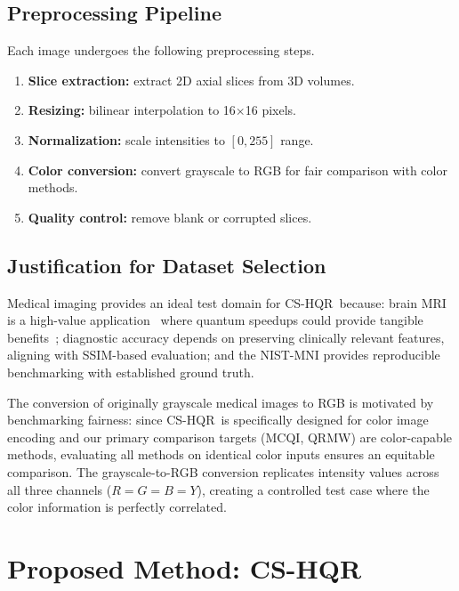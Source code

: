 \documentclass{ipol}
\newcommand{\cshqr}{\textsc{CS-HQR}}
\newcommand{\mcqi}{\textsc{MCQI}}
\begin{document}
\FloatBarrier
\subsection{Preprocessing Pipeline}

Each image undergoes the following preprocessing steps.
\begin{enumerate}
  \item \textbf{Slice extraction:} extract 2D axial slices from 3D volumes.
  \item \textbf{Resizing:} bilinear interpolation to 16$\times$16 pixels.
  \item \textbf{Normalization:} scale intensities to $[0, 255]$ range.
  \item \textbf{Color conversion:} convert grayscale to RGB for fair
    comparison with color methods.
  \item \textbf{Quality control:} remove blank or corrupted slices.
\end{enumerate}

\FloatBarrier
\subsection{Justification for Dataset Selection}

Medical imaging provides an ideal test domain for \cshqr\ because:
brain MRI is a high-value application~\cite{ref29,ref59,ref68} where quantum speedups could provide
tangible benefits~\cite{ref62,ref65}; diagnostic accuracy depends on preserving clinically
relevant features, aligning with SSIM-based evaluation; and the NIST-MNI
provides reproducible benchmarking with established ground truth.

The conversion of originally grayscale medical images to RGB is motivated by
benchmarking fairness: since \cshqr\ is specifically designed for color image
encoding and our primary comparison targets (\mcqi, QRMW) are color-capable
methods, evaluating all methods on identical color inputs ensures an equitable
comparison. The grayscale-to-RGB conversion replicates intensity values across
all three channels ($R = G = B = Y$), creating a controlled test case where
the color information is perfectly correlated.

\FloatBarrier
\section{Proposed Method: \cshqr}
\label{sec:proposed_method}
\end{document}
